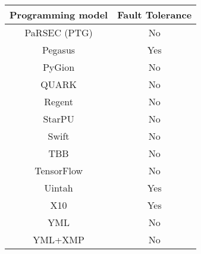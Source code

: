 \begin{tabular}{cc}
\hline
Programming model & Fault Tolerance \\
\hline
PaRSEC (PTG) & No\\
Pegasus & Yes\\
PyGion & No\\
QUARK & No\\
Regent & No\\
StarPU & No\\
Swift & No\\
TBB & No\\
TensorFlow & No\\
Uintah & Yes\\
X10 & Yes\\
YML & No\\
YML+XMP & No\\
\hline
\end{tabular}

